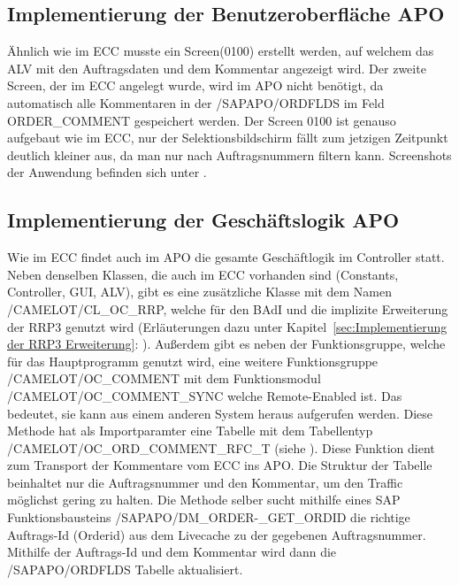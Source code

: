 \subsection{Implementierung der Benutzeroberfläche APO}
\label{sec:Implementierung der Benutzeroberfläche APO} 
Ähnlich wie im \ac{ECC} musste ein Screen(0100) erstellt werden, auf welchem das \ac{ALV} mit den Auftragsdaten und dem Kommentar angezeigt wird. Der zweite Screen, der im \ac{ECC} angelegt wurde, wird im \ac{APO} nicht benötigt, da automatisch alle Kommentaren in der /SAPAPO/ORDFLDS im Feld ORDER\_COMMENT gespeichert werden. Der Screen 0100 ist genauso aufgebaut wie im \ac{ECC}, nur der Selektionsbildschirm fällt zum jetzigen Zeitpunkt deutlich kleiner aus, da man nur nach Auftragsnummern filtern kann. Screenshots der Anwendung befinden sich unter . 

\subsection{Implementierung der Geschäftslogik APO}
\label{sec:Implementierung der Geschäftslogik APO}  
Wie im \ac{ECC} findet auch im \ac{APO} die gesamte Geschäftlogik im Controller statt. Neben denselben Klassen, die auch im \ac{ECC} vorhanden sind (Constants, Controller, \ac{GUI}, \ac{ALV}), gibt es eine zusätzliche Klasse mit dem Namen /CAMELOT/CL\_OC\_RRP, welche für den \ac{BAdI} und die implizite Erweiterung der RRP3 genutzt wird (Erläuterungen dazu unter Kapitel~\ref{sec:Implementierung der RRP3 Erweiterung}: ). Außerdem gibt es neben der Funktionsgruppe, welche für das Hauptprogramm genutzt wird, eine weitere Funktionsgruppe /CAMELOT/OC\_COMMENT mit dem Funktionsmodul /CAMELOT/OC\_COMMENT\_SYNC welche Remote-Enabled ist. Das bedeutet, sie kann aus einem anderen System heraus aufgerufen werden. Diese Methode hat als Importparamter eine Tabelle mit dem Tabellentyp /CAMELOT/OC\_ORD\_COMMENT\_RFC\_T (siehe ). Diese Funktion dient zum Transport der Kommentare vom \ac{ECC} ins \ac{APO}. Die Struktur der Tabelle beinhaltet nur die Auftragsnummer und den Kommentar, um den Traffic möglichst gering zu halten. Die Methode selber sucht mithilfe eines SAP Funktionsbausteins /SAPAPO/DM\_ORDER-\_GET\_ORDID die richtige Auftrags-Id (Orderid) aus dem Livecache zu der gegebenen Auftragsnummer. Mithilfe der Auftrags-Id und dem Kommentar wird dann die /SAPAPO/ORDFLDS Tabelle aktualisiert.  

